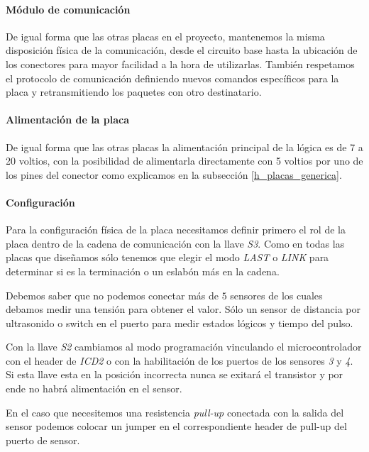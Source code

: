 \paragraph{M\'odulo de comunicaci\'on}
\label{h_placas_sensado_comm}

De igual forma que las otras placas en el proyecto, mantenemos la misma disposici\'on f\'isica de
la comunicaci\'on, desde el circuito base hasta la ubicaci\'on de los conectores para mayor facilidad
a la hora de utilizarlas.
Tambi\'en respetamos el protocolo de comunicaci\'on definiendo nuevos comandos espec\'ificos para la
placa y retransmitiendo los paquetes con otro destinatario.

\paragraph{Alimentaci\'on de la placa}
\label{h_placas_sensado_alimentacion}

De igual forma que las otras placas la alimentaci\'on principal de la l\'ogica es de 7 a 20 voltios,
con la posibilidad de alimentarla directamente con 5 voltios por uno de los pines del conector como
explicamos en la subsecci\'on \ref{h_placas_generica}.

\paragraph{Configuraci\'on}
\label{h_placas_sensado_config}

Para la configuraci\'on f\'isica de la placa necesitamos definir primero el rol de la placa dentro de
la cadena de comunicaci\'on con la llave \emph{S3}.
Como en todas las placas que dise\~namos s\'olo tenemos que elegir el modo \emph{LAST} o \emph{LINK}
para determinar si es la terminaci\'on o un eslab\'on m\'as en la cadena.

Debemos saber que no podemos conectar m\'as de $5$ sensores de los cuales debamos medir una tensi\'on
para obtener el valor.
S\'olo un sensor de distancia por ultrasonido o switch en el puerto para
medir estados l\'ogicos y tiempo del pulso.

Con la llave \emph{S2} cambiamos al modo programaci\'on vinculando el microcontrolador con el header
de \emph{ICD2} o con la habilitaci\'on de los puertos de los sensores \emph{3} y \emph{4}.
Si esta llave esta en la posici\'on incorrecta nunca se exitar\'a el transistor y por ende no habr\'a
alimentaci\'on en el sensor.

En el caso que necesitemos una resistencia \emph{pull-up} conectada con la salida del sensor podemos
colocar un jumper en el correspondiente header de pull-up del puerto de sensor.

